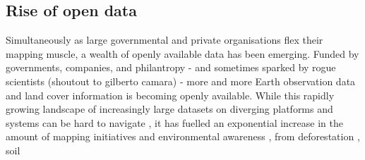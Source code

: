     \begin{table}[h]
    \centering
    \caption{Summary of Mapping Products and Data Availability}
    \label{tab:bigmaps}
    \end{table}
    
    
    \subsection*{Rise of open data}
    
    Simultaneously as large governmental and private organisations flex their mapping muscle, a wealth of openly available data has been emerging. Funded by governments, companies, and philantropy - and sometimes sparked by rogue scientists (shoutout to gilberto camara) - more and more Earth observation data and land cover information is becoming openly available. While this rapidly growing landscape of increasingly large datasets on diverging platforms and systems can be hard to navigate \citep{wagemann2021a}, it has fuelled an exponential increase in the amount of mapping initiatives and environmental awareness \citep{wulder2022fifty}, from deforestation \citep{hansen2013high}, soil \citep{hengl2017soilgrids250m}
    

